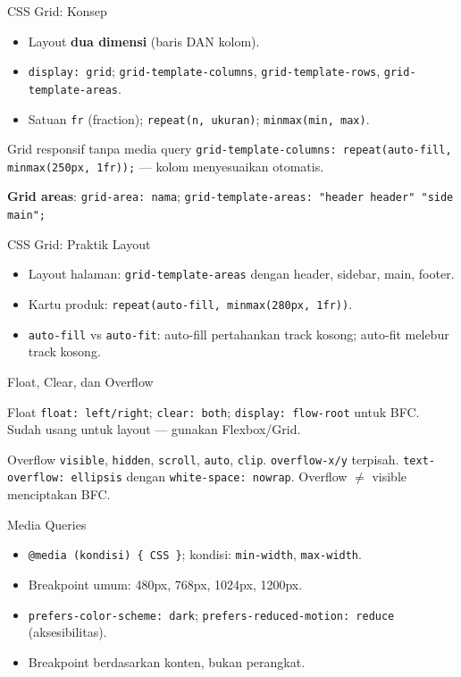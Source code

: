 \documentclass[handout]{beamer}
\begin{document}
\begin{frame}{CSS Grid: Konsep}
	\begin{itemize}
		\item Layout \textbf{dua dimensi} (baris DAN kolom).
		\item \texttt{display: grid}; \texttt{grid-template-columns}, \texttt{grid-template-rows}, \texttt{grid-template-areas}.
		\item Satuan \texttt{fr} (fraction); \texttt{repeat(n, ukuran)}; \texttt{minmax(min, max)}.
	\end{itemize}
	\begin{block}{Grid responsif tanpa media query}
		\texttt{grid-template-columns: repeat(auto-fill, minmax(250px, 1fr));} --- kolom menyesuaikan otomatis.
	\end{block}
	\textbf{Grid areas}: \texttt{grid-area: nama}; \texttt{grid-template-areas: "header header" "side main";}
\end{frame}

\begin{frame}{CSS Grid: Praktik Layout}
	\begin{itemize}
		\item Layout halaman: \texttt{grid-template-areas} dengan header, sidebar, main, footer.
		\item Kartu produk: \texttt{repeat(auto-fill, minmax(280px, 1fr))}.
		\item \texttt{auto-fill} vs \texttt{auto-fit}: auto-fill pertahankan track kosong; auto-fit melebur track kosong.
	\end{itemize}
\end{frame}

\begin{frame}{Float, Clear, dan Overflow}
	\begin{block}{Float}
		\texttt{float: left/right}; \texttt{clear: both}; \texttt{display: flow-root} untuk BFC. Sudah usang untuk layout --- gunakan Flexbox/Grid.
	\end{block}
	\begin{block}{Overflow}
		\texttt{visible}, \texttt{hidden}, \texttt{scroll}, \texttt{auto}, \texttt{clip}. \texttt{overflow-x/y} terpisah. \texttt{text-overflow: ellipsis} dengan \texttt{white-space: nowrap}. Overflow $\neq$ visible menciptakan BFC.
	\end{block}
\end{frame}

\begin{frame}{Media Queries}
	\begin{itemize}
		\item \texttt{@media (kondisi) \{ CSS \}}; kondisi: \texttt{min-width}, \texttt{max-width}.
		\item Breakpoint umum: 480px, 768px, 1024px, 1200px.
		\item \texttt{prefers-color-scheme: dark}; \texttt{prefers-reduced-motion: reduce} (aksesibilitas).
		\item Breakpoint berdasarkan konten, bukan perangkat.
	\end{itemize}
\end{frame}
\end{document}
